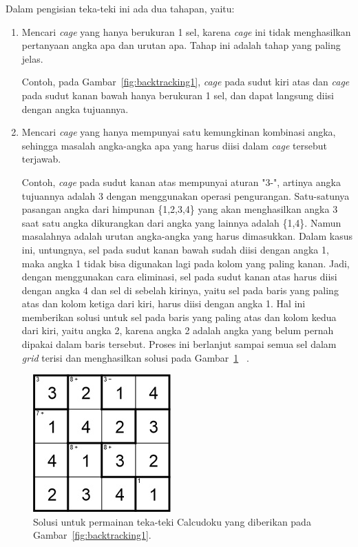 Dalam pengisian teka-teki ini ada dua tahapan, yaitu:
\begin{enumerate} 
\item Mencari \textit{cage} yang hanya berukuran 1 sel, karena \textit{cage} ini tidak menghasilkan pertanyaan angka apa dan urutan apa. Tahap ini adalah tahap yang paling jelas.

Contoh, pada Gambar~\ref{fig:backtracking1}, \textit{cage} pada sudut kiri atas dan \textit{cage} pada sudut kanan bawah hanya berukuran 1 sel, dan dapat langsung diisi dengan angka tujuannya.

\item Mencari \textit{cage} yang hanya mempunyai satu kemungkinan kombinasi angka, sehingga masalah angka-angka apa yang harus diisi dalam \textit{cage} tersebut terjawab.

Contoh, \textit{cage} pada sudut kanan atas mempunyai aturan "3-", artinya angka tujuannya adalah 3 dengan menggunakan operasi pengurangan. Satu-satunya pasangan angka dari himpunan \{1,2,3,4\} yang akan menghasilkan angka 3 saat satu angka dikurangkan dari angka yang lainnya adalah \{1,4\}. Namun masalahnya adalah urutan angka-angka yang harus dimasukkan. Dalam kasus ini, untungnya, sel pada sudut kanan bawah sudah diisi dengan angka 1, maka angka 1 tidak bisa digunakan lagi pada kolom yang paling kanan. Jadi, dengan menggunakan cara eliminasi, sel pada sudut kanan atas harus diisi dengan angka 4 dan sel di sebelah kirinya, yaitu sel pada baris yang paling atas dan kolom ketiga dari kiri, harus diisi dengan angka 1. Hal ini memberikan solusi untuk sel pada baris yang paling atas dan kolom kedua dari kiri, yaitu angka 2, karena angka 2 adalah angka yang belum pernah dipakai dalam baris tersebut. Proses ini berlanjut sampai semua sel dalam \textit{grid} terisi dan menghasilkan solusi pada Gambar~\ref{fig:backtracking2} ~\cite{fahda:16:backtracking}.
\end{enumerate}

\begin{figure}
\centering
\captionsetup{justification=centering}
\includegraphics[scale=0.75]{Gambar/Backtracking2}
\caption[Solusi untuk permainan teka-teki Calcudoku yang diberikan pada Gambar~\ref{fig:backtracking1} ~\cite{fahda:16:backtracking}]{Solusi untuk permainan teka-teki Calcudoku yang diberikan pada Gambar~\ref{fig:backtracking1}.}
\label{fig:backtracking2}
\end{figure}

